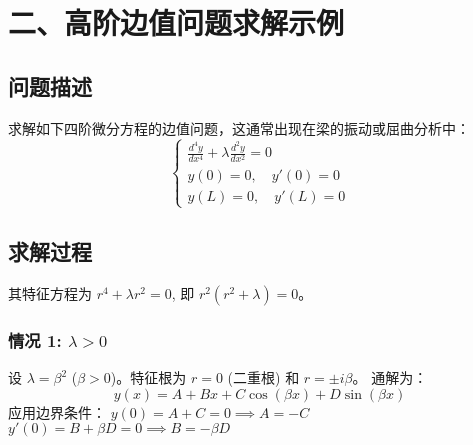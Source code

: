 \documentclass{article}
\begin{document}
	\section*{二、高阶边值问题求解示例}
	
	\subsection*{问题描述}
	求解如下四阶微分方程的边值问题，这通常出现在梁的振动或屈曲分析中：
	\[
	\begin{cases}
		\frac{d^4y}{dx^4} + \lambda \frac{d^2y}{dx^2} = 0 \\
		y(0) = 0, \quad y'(0) = 0 \\
		y(L) = 0, \quad y'(L) = 0
	\end{cases}
	\]
	
	\subsection*{求解过程}
	其特征方程为 $r^4 + \lambda r^2 = 0$, 即 $r^2(r^2 + \lambda) = 0$。
	
	\subsubsection*{情况 1: $\lambda > 0$}
	设 $\lambda = \beta^2$ ($\beta > 0$)。特征根为 $r=0$ (二重根) 和 $r=\pm i\beta$。
	通解为：
	\[
	y(x) = A + Bx + C \cos(\beta x) + D \sin(\beta x)
	\]
	应用边界条件：
	$y(0) = A + C = 0 \implies A = -C$
	$y'(0) = B + \beta D = 0 \implies B = -\beta D$
	
\end{document}
